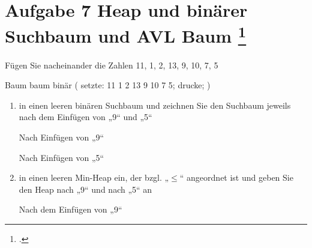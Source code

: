 \documentclass{bschlangaul-aufgabe}
\begin{document}
\section{Aufgabe 7 Heap und binärer Suchbaum und AVL Baum
\footcite{examen:46115:2014:03}}

Fügen Sie nacheinander die Zahlen 11, 1, 2, 13, 9, 10, 7, 5

\begin{liProjektSprache}{Baum}
baum binär (
  setzte: 11 1 2 13 9 10 7 5;
  drucke;
)
\end{liProjektSprache}

\begin{enumerate}


\item in einen leeren binären Suchbaum und zeichnen Sie den Suchbaum
jeweils nach dem Einfügen von „9“ und „5“

\begin{liDiagramm}{Nach Einfügen von „9“}
\end{liDiagramm}

\begin{liDiagramm}{Nach Einfügen von „5“}
\end{liDiagramm}


\item in einen leeren Min-Heap ein, der bzgl. „$\leq$“ angeordnet ist und
geben Sie den Heap nach „9“ und nach „5“ an

\begin{liDiagramm}{Nach dem Einfügen von „9“}
\end{liDiagramm}


\end{enumerate}
\end{document}

